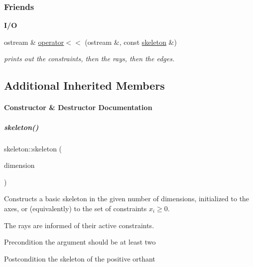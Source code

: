 \subsubsection*{Friends}
\begin{Indent}\textbf{ I/O}\par
\begin{DoxyCompactItemize}
\item 
\mbox{\label{group___c_l_s_solvers_a5732209c39488881acfc0fb5831e513b}} 
ostream \& \hyperlink{group___c_l_s_solvers_a5732209c39488881acfc0fb5831e513b}{operator$<$$<$} (ostream \&, const \hyperlink{group___c_l_s_solvers_classskeleton}{skeleton} \&)
\begin{DoxyCompactList}\small\item\em prints out the constraints, then the rays, then the edges. \end{DoxyCompactList}\end{DoxyCompactItemize}
\end{Indent}
\subsection*{Additional Inherited Members}


\paragraph{Constructor \& Destructor Documentation}
\mbox{\label{group___c_l_s_solvers_a60f5818e984abe589ea8298d189cd9c6}} 
\subparagraph{\texorpdfstring{skeleton()}{skeleton()}\hspace{0.1cm}{\footnotesize\ttfamily [1/2]}}
{\footnotesize\ttfamily skeleton\+::skeleton (\begin{DoxyParamCaption}\item[{N\+V\+A\+R\+\_\+\+T\+Y\+PE}]{dimension }\end{DoxyParamCaption})}



Constructs a basic skeleton in the given number of dimensions, initialized to the axes, or (equivalently) to the set of constraints $ x_i \geq 0 $. 

The rays are informed of their active constraints. \begin{DoxyPrecond}{Precondition}
the argument should be at least two 
\end{DoxyPrecond}
\begin{DoxyPostcond}{Postcondition}
the skeleton of the positive orthant 
\end{DoxyPostcond}


